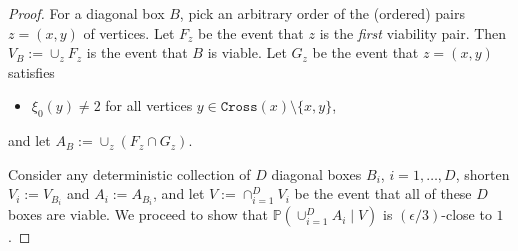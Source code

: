 \documentclass{article}
\renewcommand{\P}{\mathbb{P}}
\numberwithin{equation}{section}
\begin{document}
\begin{proof}


For a diagonal box $B$, pick an arbitrary order of the (ordered) pairs 
$z=(x,y)$ 
of vertices. Let $F_z$ be the 
event that $z$ is the {\it first\/} viability pair. Then $V_B := \cup_z F_z$ is the event 
that $B$ is viable. Let $G_z$ be the 
event that 
$z=(x,y)$ satisfies 
\begin{itemize}[leftmargin=1.25cm]
\item[(SV3')]
$\xi_0(y) \neq 2$ for all vertices $y \in \texttt{Cross}(x) \setminus \{x,y\}$,
\end{itemize}
and let $A_B := \cup_z(F_z\cap G_z)$. 


Consider any deterministic collection of $D$ diagonal boxes $B_i$, $i=1,\ldots, D$, shorten $V_i := V_{B_i}$ and 
$A_i := A_{B_i}$, and let
$V := \cap_{i=1}^D V_i$ be the event that all of these $D$ boxes are viable.
We proceed to show that $\P(\cup_{i=1}^D A_{i}\mid V)$ is 
$(\epsilon/3)$-close to $1$. 
 

\end{proof}
\end{document}

